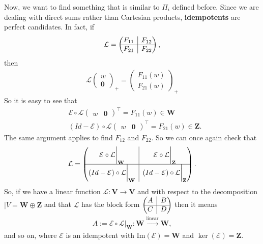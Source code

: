 \documentclass{article}
\theoremstyle{definition}
\newcommand{\V}{\mathbf{V}}
\newcommand{\W}{\mathbf{W}}
\newcommand{\Z}{\mathbf{Z}}
\newcommand{\lag}{\mathcal{L}}
\newcommand{\E}{\mathcal{E}}
\newcommand{\ima}{\text{Im}}
\newcommand{\lin}{\overset{\text{linear}}{\longrightarrow}}
\newcommand{\rvline}{\hspace*{-\arraycolsep}\vline\hspace*{-\arraycolsep}}
\begin{document}
Now, we want to find something that is similar to $\Pi_i$ defined before. Since we are dealing with direct sums rather than Cartesian products, \textbf{idempotents} are perfect candidates. In fact, if 
\begin{align*}
\lag = \begin{pmatrix}
\begin{matrix}
F_{11}
\end{matrix}
& \rvline & F_{12} \\
\hline
F_{21} & \rvline &
F_{22}
\end{pmatrix},
\end{align*}
then 
\begin{align*}
\lag\begin{pmatrix}
w\\ \mathbf{0}
\end{pmatrix}_+ = \begin{pmatrix}
F_{11}(w)\\
F_{21}(w)
\end{pmatrix}_+
\end{align*}
So it is easy to see that
\begin{align*}
&\E \circ \lag \begin{pmatrix}
w & \mathbf{0}
\end{pmatrix}^\top = F_{11}(w) \in \W\\
&(Id - \E) \circ \lag \begin{pmatrix}
w & \mathbf{0}
\end{pmatrix}^\top = F_{21}(w) \in \Z.
\end{align*}
The same argument applies to find $F_{12}$ and $F_{22}$. So we can once again check that 
\begin{align*}
\lag 
=
\begin{pmatrix}
\E \circ \lag\bigg\vert_\W & \rvline & \E\circ\lag\bigg\vert_\Z\\
\hline
(Id - \E) \circ \lag\bigg\vert_\W & \rvline & (Id - \E)\circ \lag \bigg\vert_\Z
\end{pmatrix}.
\end{align*}
So, if we have a linear function $\lag : \V \to \V$ and with respect to the decomposition $|V = \W \oplus \Z$ and that $\lag$ has the block form $\begin{pmatrix}
A & \rvline & B\\
\hline
C & \rvline & D
\end{pmatrix}$ then it means
\begin{align*}
A := \E \circ \lag \bigg\vert_\W : \W \lin \W,
\end{align*}
and so on, where $\E$ is an idempotent with $\ima(\E) = \W$ and $\ker(\E) = \Z$. \\
\end{document}
